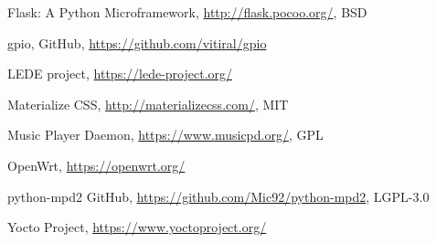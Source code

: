 \documentclass[10pt,a4paper]{article}
\begin{document}

\begin{thebibliography}{9}

		Flask: A Python Microframework,
		\url{http://flask.pocoo.org/},
		BSD

		gpio,
		GitHub,
		\url{https://github.com/vitiral/gpio}

		LEDE project,
		\url{https://lede-project.org/}

		Materialize CSS,
		\url{http://materializecss.com/},
		MIT

		Music Player Daemon,
		\url{https://www.musicpd.org/},
		GPL

		OpenWrt,
		\url{https://openwrt.org/}
	
		python-mpd2
		GitHub,
		\url{https://github.com/Mic92/python-mpd2},
		LGPL-3.0

		Yocto Project,
		\url{https://www.yoctoproject.org/}

\end{thebibliography}
\end{document}
